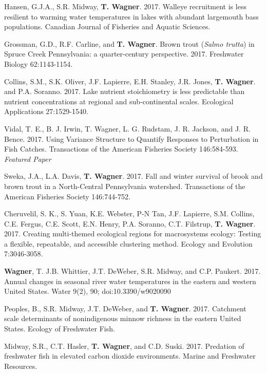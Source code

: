 \documentclass[10pt]{article}
\begin{document}
\begin{flushleft}
\begin{etaremune}[start=72]
\item Hansen, G.J.A., S.R. Midway, {\bf T. Wagner}. 2017. Walleye recruitment is less resilient to warming water temperatures in lakes with abundant largemouth bass populations. Canadian Journal of Fisheries and Aquatic Sciences.

\item Grossman, G.D., R.F. Carline, and {\bf T. Wagner}. Brown trout (\emph{Salmo trutta}) in Spruce Creek Pennsylvania: a quarter-century perspective. 2017. Freshwater Biology 62:1143-1154.

\item Collins, S.M., S.K. Oliver, J.F. Lapierre, E.H. Stanley, J.R. Jones, {\bf T. Wagner}. and P.A. Soranno. 2017. Lake nutrient stoichiometry is less predictable than nutrient concentrations at regional and sub-continental scales. Ecological Applications 27:1529-1540.

\item Vidal, T. E., B. J. Irwin, T. Wagner, L. G. Rudstam, J. R. Jackson, and J. R. Bence. 2017. Using Variance Structure to Quantify Responses to Perturbation in Fish Catches. Transactions of the American Fisheries Society 146:584-593. \emph{Featured Paper}

\item Sweka, J.A., L.A. Davis, {\bf T. Wagner}. 2017. Fall and winter survival of brook and brown trout in a North-Central Pennsylvania watershed. Transactions of the American Fisheries Society 146:744-752.

\item Cheruvelil, S. K., S. Yuan, K.E. Webster, P-N Tan, J.F. Lapierre, S.M. Collins, C.E. Fergus, C.E. Scott, E.N. Henry, P.A. Soranno, C.T. Filstrup, {\bf T. Wagner}. 2017. Creating multi-themed ecological regions for macrosystems ecology: Testing a flexible, repeatable, and accessible clustering method. Ecology and Evolution 7:3046-3058.

\item {\bf Wagner}, T. J.B. Whittier, J.T. DeWeber, S.R. Midway, and C.P. Paukert. 2017. Annual changes in seasonal river water temperatures in the eastern and western United States. Water 9(2), 90; doi:10.3390/w9020090

\item Peoples, B., S.R. Midway, J.T. DeWeber, and {\bf T. Wagner}. 2017. Catchment scale determinants of nonindigenous minnow richness in the eastern United States. Ecology of Freshwater Fish.

\item Midway, S.R., C.T. Hasler, {\bf T. Wagner}, and C.D. Suski. 2017. Predation of freshwater fish in elevated carbon dioxide environments. Marine and Freshwater Resources.


\end{etaremune}
\end{flushleft}
\end{document}
